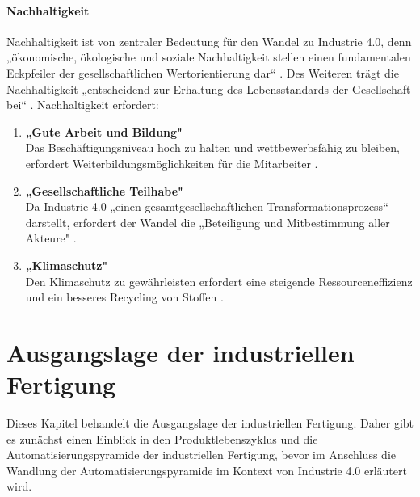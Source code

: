 \paragraph{Nachhaltigkeit}\label{sec:Nachhaltigkeit}
\noindent Nachhaltigkeit ist von zentraler Bedeutung für den Wandel zu Industrie 4.0, denn „ökonomische, ökologische und soziale Nachhaltigkeit stellen einen fundamentalen Eckpfeiler der gesellschaftlichen Wertorientierung dar“ \cite[S.6]{3}. Des Weiteren trägt die Nachhaltigkeit „entscheidend zur Erhaltung des Lebensstandards der Gesellschaft bei“ \cite[S.6]{3}.
Nachhaltigkeit erfordert:
\begin{enumerate}
	\item \textbf{„Gute Arbeit und Bildung"} \cite[S.6]{3} \\
	Das Beschäftigungsniveau hoch zu halten und wettbewerbsfähig zu bleiben, erfordert
	Weiterbildungsmöglichkeiten für die Mitarbeiter \cite[S.6]{3}.
	\item \textbf{„Gesellschaftliche Teilhabe"} \cite[S.6]{3} \\
	Da Industrie 4.0 „einen gesamtgesellschaftlichen Transformationsprozess“ \cite[S.6]{3} darstellt, erfordert der Wandel die „Beteiligung und Mitbestimmung aller Akteure" \cite[S.6]{3}.
	\item \textbf{„Klimaschutz"} \cite[S.6]{3} \\
	Den Klimaschutz zu gewährleisten erfordert eine steigende Ressourceneffizienz
	und ein besseres Recycling von Stoffen \cite[S.6]{3}.
\end{enumerate}
\section{Ausgangslage der industriellen Fertigung}\label{sec:IndustrielleFertigung}
Dieses Kapitel behandelt die Ausgangslage der industriellen Fertigung. Daher gibt es zunächst einen Einblick in den Produktlebenszyklus und die Automatisierungspyramide der industriellen Fertigung, bevor im Anschluss die Wandlung der Automatisierungspyramide im Kontext von Industrie 4.0 erläutert wird.

